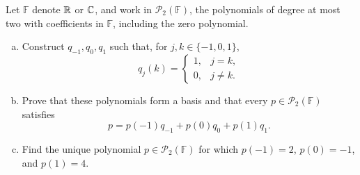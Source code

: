 \begin{exercise}
  \label{ex:hw01:polynomial-interpolation}
  Let \(\mathbb F\) denote \(\mathbb{R}\) or \(\mathbb{C}\), and work in
  \(\mathcal P_2(\mathbb F)\), the polynomials of degree at most two
  with coefficients in \(\mathbb F\), including the zero polynomial.
  \begin{enumerate}[(a)][2]
    \item Construct \(q_{-1},q_0,q_1\) such that, for
      \(j,k\in\{-1,0,1\}\),
      \[
        q_j(k)=
        \begin{cases}
          1,&j=k,\\
          0,&j\ne k.
        \end{cases}
      \]
    \item Prove that these polynomials form a basis and that every
      \(p\in\mathcal P_2(\mathbb F)\) satisfies
      \[
        p=p(-1)q_{-1}+p(0)q_0+p(1)q_1.
      \]
    \item Find the unique polynomial \(p\in\mathcal P_2(\mathbb F)\)
      for which \(p(-1)=2\), \(p(0)=-1\), and \(p(1)=4\).
  \end{enumerate}
\end{exercise}
